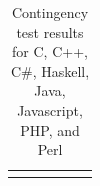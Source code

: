 \documentclass[10pt]{sigplanconf}
\begin{document}
\begin{table}
{\begin{tabular}{l c c c c c}
\hline
& \\
\end{tabular}
} 
\caption{Contingency test results for C, C++, C\#, Haskell, Java, Javascript, PHP, and Perl}
\label{tbl:contingency-test-results-1}
\end{table}
\end{document}
